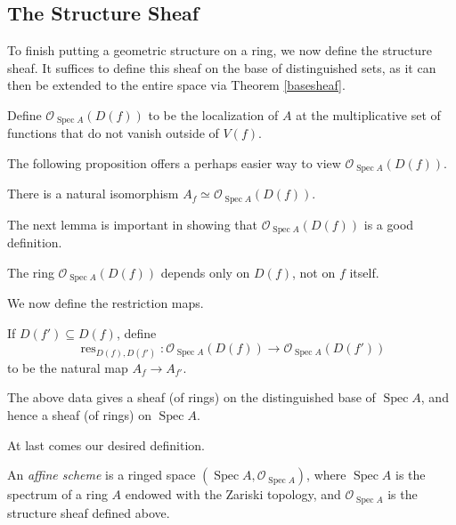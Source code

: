 \documentclass[11pt,openany]{book} %
\newcommand{\spc}{\operatorname{Spec}}
\begin{document}
\subsection{The Structure Sheaf}
To finish putting a geometric structure on a ring, we now define the structure sheaf. It suffices to define this sheaf on the base of distinguished sets, as it can then be extended to the entire space via Theorem \ref{basesheaf}.\\

\begin{definition}
Define $\mathcal{O}_{\spc A}(D(f))$ to be the localization of $A$ at the multiplicative set of functions that do not vanish outside of $V(f)$.
\end{definition}
\hfill

The following proposition offers a perhaps easier way to view $\mathcal{O}_{\spc A}(D(f))$.\\

\begin{proposition}
There is a natural isomorphism $A_f \simeq \mathcal{O}_{\spc A}(D(f))$.
\end{proposition}
\hfill

The next lemma is important in showing that $\mathcal{O}_{\spc A}(D(f))$ is a good definition.\\

\begin{lemma}
The ring $\mathcal{O}_{\spc A}(D(f))$ depends only on $D(f)$, not on $f$ itself.
\end{lemma}
\hfill

We now define the restriction maps.\\

\begin{definition}
If $D(f') \subseteq D(f)$, define
\[
	\operatorname{res}_{D(f),D(f')} : \mathcal{O}_{\spc A}(D(f)) \to \mathcal{O}_{\spc A}(D(f'))
\]
to be the natural map $A_f \to A_{f'}$.
\end{definition}
\hfill

\begin{theorem}
The above data gives a sheaf (of rings) on the distinguished base of $\spc A$, and hence a sheaf (of rings) on $\spc A$.
\end{theorem}
\hfill

At last comes our desired definition.\\

\begin{definition}
An \emph{affine scheme} is a ringed space $(\spc A, \mathcal{O}_{\spc A})$, where $\spc A$ is the spectrum of a ring $A$ endowed with the Zariski topology, and $\mathcal{O}_{\spc A}$ is the structure sheaf defined above.
\end{definition}
\end{document}
